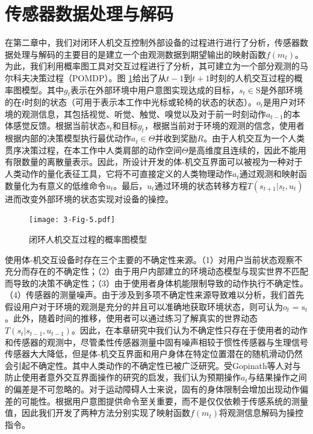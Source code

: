 \section{传感器数据处理与解码} 
在第二章中，我们对闭环人机交互控制外部设备的过程进行进行了分析，传感器数据处理与解码的主要目的是建立一个由观测数据到期望输出的映射函数$f(m_t)$。为此，我们利用概率图工具对交互过程进行了分析，其可建立为一个部分观测的马尔科夫决策过程（POMDP）。图
\ref{3-fig-5}给出了从$t-1$到$t+1$时刻的人机交互过程的概率图模型。其中${g_t}$表示在外部环境中用户意图实现达成的目标，${s_t} \in {\text{S}}$是外部环境的在$t$时刻的状态（可用于表示本工作中光标或轮椅的状态的状态）。${o_t}$是用户对环境的观测信息，其包括视觉、听觉、触觉、嗅觉以及对于前一时刻动作${a_{t - 1}}$的本体感觉反馈。根据当前状态${s_t}$和目标${g_t}$，根据当前对于环境的观测的信念，使用者根据内部的决策模型执行最优动作${a_t} \in \Theta $并收到奖励$R$。由于人机交互为一个人类贯序决策过程，在本工作中人类肩部的动作空间$\Theta $是高维度且连续的，因此不能用有限数量的离散量表示。因此，所设计开发的体-机交互界面可以被视为一种对于人类动作的量化表征工具，它将不可直接定义的人类物理动作${a_t}$通过观测和映射函数量化为有意义的低维命令${u_t}$。最后，${u_t}$通过环境的状态转移方程$T({s_{t+1}}|{s_{t}},{u_{t}})$进而改变外部环境的状态实现对设备的操控。

\begin{figure}[!t]
    \centering
    \texttt{[image: 3-Fig-5.pdf]}
    \caption{闭环人机交互过程的概率图模型}
    \label{3-fig-5}
\end{figure} 

使用体-机交互设备时存在三个主要的不确定性来源。（1）对用户当前状态观察不充分而存在的不确定性；（2）由于用户内部建立的环境动态模型与现实世界不匹配而导致的决策不确定性；（3）由于使用者身体机能限制导致的动作执行不确定性。（4）传感器的测量噪声。由于涉及到多项不确定性来源导致难以分析，我们首先假设用户对于环境的观测是充分的并且可以准确地获取环境状态，则可认为${o_t}{\text{ = }}{{\text{s}}_t}$。此外，随着时间的推移，使用者可以通过练习了解真实的世界动态$T({s_t}|{s_{t - 1}},{u_{t - 1}})$。因此，在本章研究中我们认为不确定性只存在于使用者的动作和传感器的观测中，尽管柔性传感器测量中固有噪声相较于惯性传感器与生理信号传感器大大降低，但是体-机交互界面和用户身体在特定位置潜在的随机滑动仍然会引起不确定性。其中人类动作的不确定性已被广泛研究\cite{churchlandCentralSourceMovement2006,vanbeersRoleExecutionNoise2004, desantisGuidingFunctionalReorganization2020a}。受Gopinath等人对与防止使用者意外交互界面操作的研究\cite{gopinathCustomizedHandlingUnintended2021}的启发，我们认为预期操作$a_t$与结果操作之间的偏差是不可忽略的。对于运动障碍人士来说，固有的身体限制会增加出现动作偏差的可能性。根据用户意图提供命令至关重要，而不是仅仅依赖于传感系统的测量值，因此我们开发了两种方法分别实现了映射函数$f(m_t)$将观测信息解码为操控指令。  

